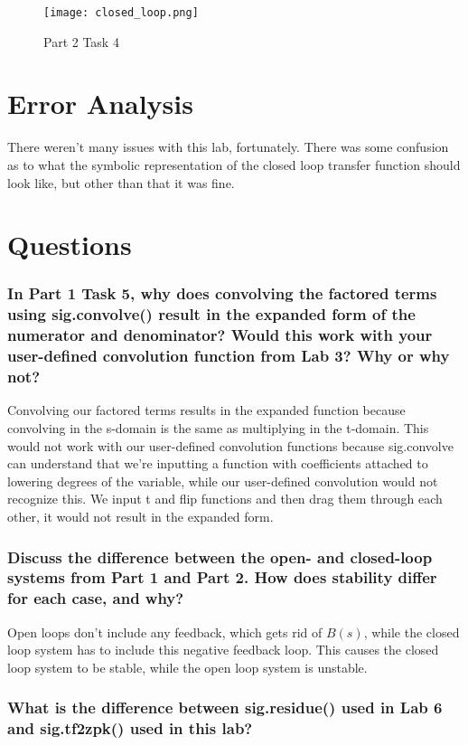\documentclass[12pt]{report}
\begin{document}
\begin{figure}[H]
    \centering
    \texttt{[image: closed\_loop.png]}
    \caption{Part 2 Task 4}
\end{figure}
 
 \section{Error Analysis}
 
 There weren't many issues with this lab, fortunately. There was some confusion as to what the symbolic representation of the closed loop transfer function should look like, but other than that it was fine.
 
 \section{Questions}
 \subsubsection{In Part 1 Task 5, why does convolving the factored terms using sig.convolve() result in the expanded form of the numerator and denominator? Would this work with your user-defined convolution function from Lab 3? Why or why not?}
 
 Convolving our factored terms results in the expanded function because convolving in the s-domain is the same as multiplying in the t-domain. This would not work with our user-defined convolution functions because sig.convolve can understand that we're inputting a function with coefficients attached to lowering degrees of the variable, while our user-defined convolution would not recognize this. We input t and flip functions and then drag them through each other, it would not result in the expanded form.
 
 \subsubsection{Discuss the difference between the open- and closed-loop systems from Part 1 and Part 2. How does stability differ for each case, and why?}
 
 Open loops don't include any feedback, which gets rid of $B(s)$, while the closed loop system has to include this negative feedback loop. This causes the closed loop system to be stable, while the open loop system is unstable.  
 
 \subsubsection{What is the difference between sig.residue() used in Lab 6 and sig.tf2zpk() used in this lab?}
 
\end{document}
